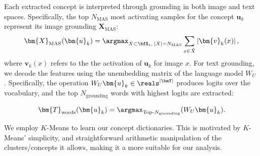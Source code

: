 Each extracted concept is interpreted through grounding in both image and text spaces. Specifically, the top $N_{\text{MAS}}$ most activating samples for the concept $\bm{u}_k$ represent its image grounding $\bm{X}_{\text{MAS}}$:
\begin{equation}
\label{eq:mas}
\bm{X}_{\text{MAS}}(\bm{u}_k) = \argmax_{\hat{X} \subset \bfX_t ,\; |\hat{X}| = N_{\text{MAS}}} \sum_{x \in \hat{X}} \left| \bm{v}_k (x) \right|,
\end{equation}
where $\bm{v}_k(x)$ refers to the the activation of $\bm{u}_k$ for image $x$. For text grounding, we decode the features using the unembedding matrix of the language model $W_U$ \cite{Belrose2023ElicitingLP,Langedijk2023DecoderLensLI,nostalgebraist2020interpreting,DBLP:journals/corr/abs-2310-16270}. Specifically, the operation $W_U \bm{u}_k \in \reals^{|\bmY|}$ produces logits over the vocabulary, and the top $N_{\text{grounding}}$ words with highest logits are extracted:

\begin{equation}
\label{eq:text_ground}
\bm{T}_{\text{words}}(\bm{u}_k) = \argmax_{\text{Top-}N_{\text{grounding}}} (W_U \bm{u}_k).
\end{equation}

We employ $K$-Means to learn our concept dictionaries. This is motivated by $K$-Means' simplicity, and straightforward arithmetic manipulation of the clusters/concepts it allows, making it a more suitable for our analysis.



